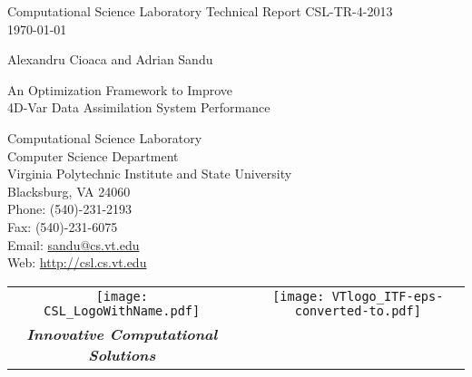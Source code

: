 \documentclass{article}
\begin{document}
\clearpage{}\thispagestyle{empty}
\setcounter{page}{0}

\begin{Huge}
\begin{center}
Computational Science Laboratory Technical Report CSL-TR-4-2013 \\
\today
\end{center}
\end{Huge}
\vfil
\begin{huge}
\begin{center}
Alexandru Cioaca and Adrian Sandu
\end{center}
\end{huge}

\vfil
\begin{huge}
\begin{it}
\begin{center}
An Optimization Framework to Improve \\ 
4D-Var Data Assimilation System Performance
\end{center}
\end{it}
\end{huge}
\vfil


\begin{large}
\begin{center}
Computational Science Laboratory \\
Computer Science Department \\
Virginia Polytechnic Institute and State University \\
Blacksburg, VA 24060 \\
Phone: (540)-231-2193 \\
Fax: (540)-231-6075 \\ 
Email: \url{sandu@cs.vt.edu} \\
Web: \url{http://csl.cs.vt.edu}
\end{center}
\end{large}

\vspace*{1cm}


\begin{tabular}{ccc}
\texttt{[image: CSL\_LogoWithName.pdf]}
&\hspace{2.5in}&
\texttt{[image: VTlogo\_ITF-eps-converted-to.pdf]} \\
{\bf\em Innovative Computational Solutions} &&\\
\end{tabular}

\newpage
\clearpage{}
\end{document}
